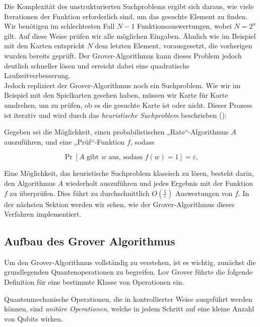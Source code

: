 {Die Komplexität des unstrukturierten Suchproblems ergibt sich daraus, wie viele Iterationen der Funktion erforderlich sind, um das gesuchte Element zu finden. Wir benötigen im schlechtesten Fall $N - 1$ Funktionsauswertungen, wobei $N = 2^n$ gilt. Auf diese Weise prüfen wir alle möglichen Eingaben. Ähnlich wie im Beispiel mit den Karten entspricht $N$ dem letzten Element, vorausgesetzt, die vorherigen wurden bereits geprüft. Der Grover-Algorithmus kann dieses Problem jedoch deutlich schneller lösen und erreicht dabei eine quadratische Laufzeitverbesserung.\\

Jedoch repliziert der Grover-Algorithmus noch ein Suchproblem. Wie wir im Beispiel mit den Spielkarten gesehen haben, müssen wir Karte für Karte umdrehen, um zu prüfen, ob es die gesuchte Karte ist oder nicht. Dieser Prozess ist iterativ und wird durch das \textit{heuristische Suchproblem} beschrieben (\cite{montanaro_quantum_2016}):

\begin{definition}
Gegeben sei die Möglichkeit, einen probabilistischen „Rate“-Algorithmus \( A \) auszuführen, und eine „Prüf“-Funktion \( f \), sodass

\[
\Pr\left[ A \text{ gibt } w \text{ aus, sodass } f(w) = 1 \right] = \varepsilon,
\]
\end{definition}

Eine Möglichkeit, das heuristische Suchproblem klassisch zu lösen, besteht darin, den Algorithmus \( A \) wiederholt auszuführen und jedes Ergebnis mit der Funktion \( f \) zu überprüfen. Dies führt zu durchschnittlich \( O\left(\frac{1}{\varepsilon}\right) \) Auswertungen von \( f \). In der nächsten Sektion werden wir sehen, wie der Grover-Algorithmus dieses Verfahren implementiert.

\subsection{Aufbau des Grover Algorithmus}

Um den Grover-Algorithmus vollständig zu verstehen, ist es wichtig, zunächst die grundlegenden Quantenoperationen zu begreifen. Lov Grover führte die folgende Definition für eine bestimmte Klasse von Operationen ein.\cite[1-2]{zotero-1211}

\begin{definition}
Quantenmechanische Operationen, die in kontrollierter Weise ausgeführt werden können, sind \emph{unitäre Operationen}, welche in jedem Schritt auf eine kleine Anzahl von Qubits wirken.
\end{definition}

}
